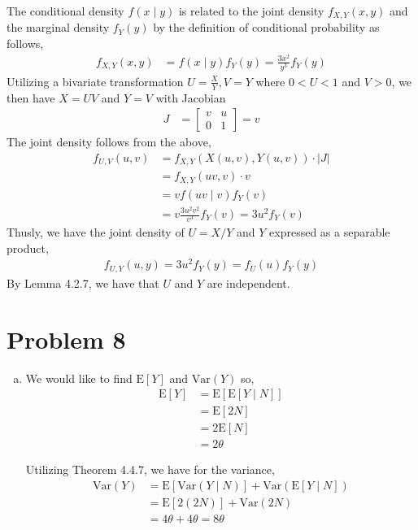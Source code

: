 \documentclass[11pt]{article}
\begin{document}
\begin{enumerate}[(a)]
The conditional density $f(x \mid y)$ is related to the joint density
$f_{X,Y}(x,y)$ and the marginal density $f_Y(y)$ by the definition of
conditional probability as follows,
\begin{align*}
  f_{X,Y}(x,y) &= f(x \mid y) f_Y(y) = \frac{3x^2}{y^3} f_Y(y)
\end{align*}
Utilizing a bivariate transformation $U = \frac{X}{Y}, V = Y$ where
$0<U<1$ and $V>0$, we then have $X = UV$ and $Y=V$ with Jacobian
\begin{align*}
  J &= \begin{bmatrix} v & u \\ 0 & 1 \end{bmatrix} = v
\end{align*}
The joint density follows from the above,
\begin{align*}
  f_{U,V} (u,v) &= f_{X,Y}(X(u,v), Y(u,v)) \cdot \left| J \right| \\
  &= f_{X,Y}(uv, v) \cdot v \\
  &= v f(uv \mid v) f_Y(v) \\
  &= v \frac{3u^2v^2}{v^3} f_Y(v) = 3u^2 f_Y(v)
\end{align*}
Thusly, we have the joint density of $U = X/Y$ and $Y$ expressed as a
separable product,
\begin{align*}
  f_{U,Y}(u,y) = 3u^2 f_Y(y) = f_U(u) f_Y(y)
\end{align*}
By Lemma 4.2.7, we have that $U$ and $Y$ are independent.

\section*{Problem 8}

\begin{enumerate}[(a)]
  \item We would like to find $\mathrm{E}[Y]$ and $\mathrm{Var}(Y)$
    so,
    \begin{align*}
      \mathrm{E}[Y] &= \mathrm{E}[\mathrm{E}[Y \mid N]] \\
      &= \mathrm{E}[2N] \\
      &= 2 \mathrm{E}[N] \\
      &= 2 \theta
    \end{align*}

    Utilizing Theorem 4.4.7, we have for the variance,
    \begin{align*}
      \mathrm{Var}(Y) &= \mathrm{E}[\mathrm{Var}(Y \mid N)] +
                        \mathrm{Var}(\mathrm{E}[Y \mid N]) \\
      &= \mathrm{E}[2(2N)] + \mathrm{Var}(2N) \\
      &= 4 \theta + 4 \theta = 8 \theta
    \end{align*}


\end{enumerate}
\end{enumerate}
\end{document}
